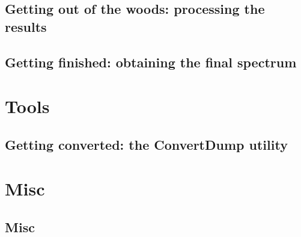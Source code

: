 \documentclass[a4paper,fleqn]{report}
\begin{document}
	\chapter{Getting out of the woods: processing the results}
	
	
	\chapter{Getting finished: obtaining the final spectrum}
	
	
	\part{Tools}
	\chapter{Getting converted: the ConvertDump utility}\label{chap:convertdump}
	
	
	\part{Misc}
	\chapter{Misc}
	
	
	\newpage
	\begin{spacing}{0.75}
		\label{Referenties}
		\clearpage
		\renewcommand{\bibname}{Referenties}
		
	\end{spacing}
\end{document}
